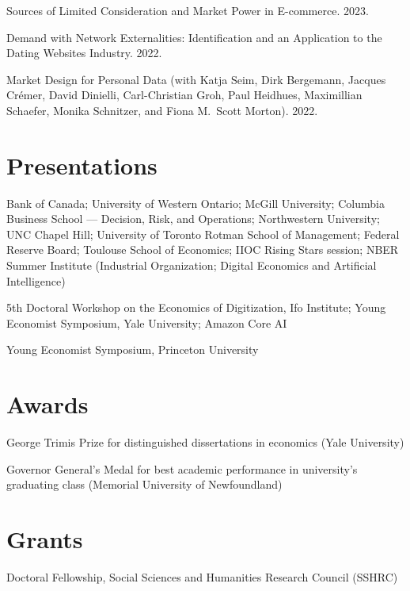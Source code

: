 \documentclass[11pt]{article} %
\begin{document}
\medskip

Sources of Limited Consideration and Market Power in E-commerce. 2023.

\medskip


 
Demand with Network Externalities: 
Identification and an Application to the Dating Websites Industry. 2022.




\medskip

Market Design for Personal Data
(with Katja Seim, Dirk Bergemann, Jacques Cr\'{e}mer, David Dinielli, 
Carl-Christian Groh, Paul Heidhues, Maximillian Schaefer, 
Monika Schnitzer, and Fiona M.\ Scott Morton).
2022.




\section*{Presentations}

 Bank of Canada; University of Western Ontario;
	McGill University; Columbia Business School --- Decision, Risk, and Operations;
	Northwestern University; UNC Chapel Hill; University of Toronto Rotman School
	of Management; Federal Reserve Board; Toulouse School of Economics;
	IIOC Rising Stars session; NBER Summer Institute 
	(Industrial Organization; Digital Economics and Artificial Intelligence)


 5th Doctoral Workshop on the Economics of Digitization, Ifo Institute; 
	Young Economist Symposium, Yale University; Amazon Core AI


 Young Economist Symposium, Princeton University

\section*{Awards}

 George Trimis Prize for distinguished dissertations in economics (Yale University)

 Governor General's Medal for best academic performance in university's graduating class
	(Memorial University of Newfoundland)

\section*{Grants}

 Doctoral Fellowship, Social Sciences and Humanities Research Council (SSHRC)
\end{document}
